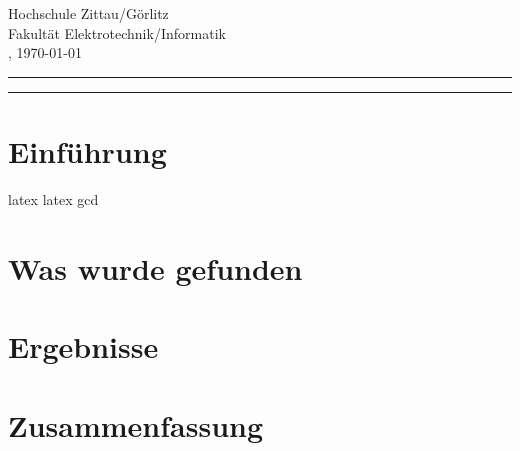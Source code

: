 \documentclass[../main.tex]{subfiles}
\begin{document}
\begin{center}
    \Huge
    \textbf{\paperTitle}\\
    \vspace{0.5cm}
    \large
    \authorName\\
    \vspace{0.5cm}
    \footnotesize
    Hochschule Zittau/Görlitz\\
    Fakultät Elektrotechnik/Informatik\\
    \place, \today
    \vspace{1cm}
    
\end{center}

\normalsize
\hrule
    \vspace{0.25cm}
    \begin{abstract}
        
    \end{abstract}
    \vspace{0.5cm}
\hrule

\begin{multicols}{2}[]
\section{Einführung}
\cite{sansom1958history}
\gls{latex}
\Gls{latex}
\acrshort{gcd}
\lipsum
\section{Was wurde gefunden}
\lipsum
\section{Ergebnisse}
\lipsum
\section{Zusammenfassung}
\lipsum
\end{multicols}
\end{document}
